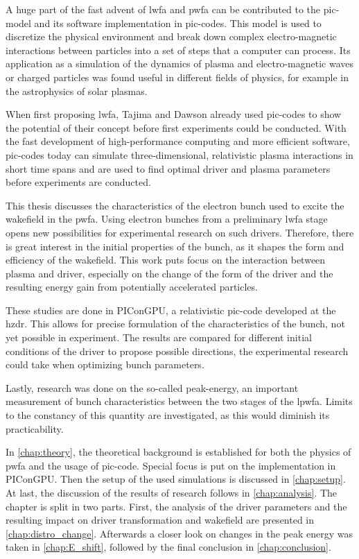 \documentclass[bachelor_thesis]{subfiles}
\begin{document}
A huge part of the fast advent of \gls{lwfa} and \gls{pwfa} can be contributed to the \gls{pic}-model and its software implementation in \gls{pic}-codes.
This model is used to discretize the physical environment and break down complex electro-magnetic interactions between particles into a set of steps that a computer can process.
Its application as a simulation of the dynamics of plasma and electro-magnetic waves or charged particles was found useful in different fields of physics, for example in the astrophysics of solar plasmas.

When first proposing \gls{lwfa}, Tajima and Dawson already used \gls{pic}-codes to show the potential of their concept before first experiments could be conducted. 
With the fast development of high-performance computing and more efficient software, \gls{pic}-codes today can simulate three-dimensional, relativistic plasma interactions in short time spans
and are used to find optimal driver and plasma parameters before experiments are conducted.

This thesis discusses the characteristics of the electron bunch used to excite the wakefield in the \gls{pwfa}.
Using electron bunches from a preliminary \gls{lwfa} stage opens new possibilities for experimental research on such drivers.
Therefore, there is great interest in the initial properties of the bunch, as it shapes the form and efficiency of the wakefield.
This work puts focus on the interaction between plasma and driver, especially on the change of the form of the driver and the resulting energy gain from potentially accelerated particles.

These studies are done in PIConGPU, a relativistic \gls{pic}-code developed at the \gls{hzdr}. This allows for precise formulation of the characteristics of the bunch, not yet possible in experiment.
The results are compared for different initial conditions of the driver to propose possible directions, the experimental research could take when optimizing bunch parameters.

Lastly, research was done on the so-called peak-energy, an important measurement of bunch characteristics between the two stages of the \gls{lpwfa}.
Limits to the constancy of this quantity are investigated, as this would diminish its practicability.

In \autoref{chap:theory}, the theoretical background is established for both the physics of \gls{pwfa} and the usage of \gls{pic}-code. Special focus is put on the implementation in PIConGPU.
Then the setup of the used simulations is discussed in \autoref{chap:setup}.
At last, the discussion of the results of research follows in \autoref{chap:analysis}. The chapter is split in two parts. First, the analysis of the driver parameters and the resulting impact on driver transformation and wakefield are presented in \autoref{chap:distro_change}.
Afterwards a closer look on changes in the peak energy was taken in \autoref{chap:E_shift}, followed by the final conclusion in \autoref{chap:conclusion}.
\end{document}
